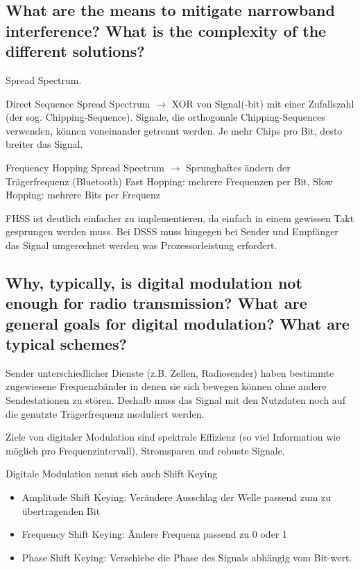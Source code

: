 \subsection{What are the means to mitigate narrowband interference? What is the complexity of
the different solutions?}
Spread Spectrum.

Direct Sequence Spread Spectrum $\rightarrow$ XOR von Signal(-bit) mit einer Zufallszahl (der sog. Chipping-Sequence). Signale, die orthogonale Chipping-Sequences verwenden, können voneinander getrennt werden. Je mehr Chips pro Bit, desto breiter das Signal. 

Frequency Hopping Spread Spectrum $\rightarrow$ Sprunghaftes ändern der Trägerfrequenz (Bluetooth)
Fast Hopping: mehrere Frequenzen per Bit, Slow Hopping: mehrere Bits per Frequenz

FHSS ist deutlich einfacher zu implementieren, da einfach in einem gewissen Takt gesprungen werden muss. Bei DSSS muss hingegen bei Sender und Empfänger das Signal umgerechnet werden was Prozessorleistung erfordert.

\subsection{Why, typically, is digital modulation not enough for radio transmission? What are
general goals for digital modulation? What are typical schemes?}
Sender unterschiedlicher Dienste (z.B. Zellen, Radiosender) haben bestimmte zugewiesene  
Frequenzbänder in denen sie sich bewegen können ohne andere Sendestationen zu stören. Deshalb muss das Signal mit den Nutzdaten noch auf die genutzte Trägerfrequenz moduliert werden.

Ziele von digitaler Modulation sind spektrale Effizienz (so viel Information wie möglich pro Frequenzintervall), Stromsparen und robuste Signale.

Digitale Modulation nennt sich auch Shift Keying
\begin{itemize}

\item Amplitude Shift Keying: Verändere Ausschlag der Welle passend zum zu übertragenden Bit

\item Frequency Shift Keying: Ändere Frequenz passend zu 0 oder 1

\item Phase Shift Keying: Verschiebe die Phase des Signals abhängig vom Bit-wert.

\end{itemize}

